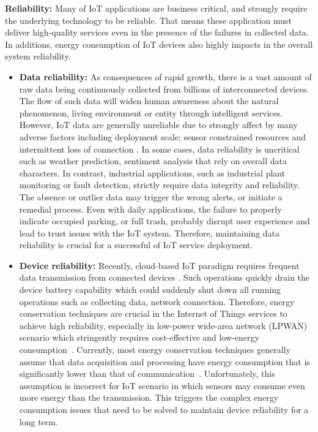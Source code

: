 \par\textbf{Reliability: } Many of IoT applications are business critical, and strongly require the underlying technology to be reliable. That means these application must deliver high-quality services even in the presence of the failures in collected data. In additions, energy consumption of IoT devices also highly impacts in the overall system reliability. 

\begin{itemize}

    \item \textbf{Data reliability: }As consequences of rapid growth, there is a vast amount of raw data being continuously collected from billions of interconnected devices. The flow of such data will widen human awareness about the natural phenomenon, living environment or entity through intelligent services.  However, IoT data are generally unreliable due to strongly affect by many adverse factors including deployment scale; sensor constrained resources \cite{branch2013network} and intermittent loss of connection \cite{zeng2011web}. In some cases, data reliability is uncritical such as weather prediction, sentiment analysis that rely on overall data characters. In contrast, industrial applications, such as industrial plant monitoring or fault detection, strictly require data integrity and reliability. The absence or outlier data may trigger the wrong alerts, or initiate a remedial process. Even with daily applications, the failure to properly indicate occupied parking, or full trash, probably disrupt user experience and lead to trust issues with the IoT system. Therefore, maintaining data reliability is crucial for a successful of IoT service deployment. 
    
    \item \textbf{Device reliability: } Recently, cloud-based IoT paradigm requires frequent data transmission from connected devices \cite{lee2010extending}. Such operations quickly drain the device battery capability which could suddenly shut down all running operations such as collecting data, network connection. Therefore, energy conservation techniques are crucial in the Internet of Things services to achieve high reliability, especially in low-power wide-area network (LPWAN)~ scenario which stringently requires cost-effective and low-energy consumption~\cite{mikhaylov2016analysis}. Currently, most energy conservation techniques generally assume that data acquisition and processing have energy consumption that is significantly lower than that of communication~\cite{alippi2010adaptive}. Unfortunately, this assumption is incorrect for IoT scenario in which sensors may consume even more energy than the transmission. This triggers the complex energy consumption issues that need to be solved to maintain device reliability for a long term.
    
\end{itemize}

